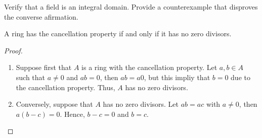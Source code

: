\documentclass[11pt,a4paper]{article}
\begin{document}
\begin{eje}
    Verify that a  field is an integral domain.
    Provide a counterexample that disproves the converse afirmation.
\end{eje}

\begin{prop} 
A ring has the  cancellation property if and only if it has no zero divisors.
\end{prop} 

\begin{proof}
\begin{enumerate}[label=(\roman*)]
\item Suppose first that $A$ is a ring with the cancellation property. Let $a,b\in A$ such that $a\neq 0$ and $ab=0$, then $ab=a0$, but this impliy that $b=0$ due to the cancellation property. Thus, $A$ has no zero divisors.
\item Conversely, suppose that $A$ has no zero divisors. Let $ab=ac$ with $a\neq0$, then $a(b-c)=0$. Hence, $b-c=0$ and $b=c$.
\end{enumerate}
\end{proof}
  
\end{document}
